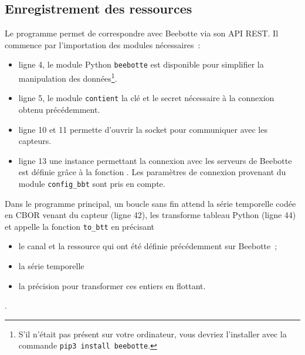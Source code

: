 \subsection{Enregistrement des ressources}

Le programme  permet de correspondre avec Beebotte via son API REST. Il commence par l'importation des modules nécessaires~:



\begin{itemize}
    \item ligne 4, le module Python \texttt{beebotte}  est disponible pour simplifier la manipulation des données\footnote{S'il n'était pas présent sur votre ordinateur, vous devriez l'installer avec la commande \texttt{pip3 install beebotte}.}.
    \item ligne 5, le module \texttt{contient} la clé et le secret nécessaire à la connexion obtenu précédemment.
    
\end{itemize}




\begin{itemize}
    \item ligne 10 et 11 permette d'ouvrir la socket pour communiquer avec les capteurs.
\end{itemize}



\begin{itemize}
    \item ligne 13 une instance permettant la connexion avec les serveurs de Beebotte est définie grâce à la fonction . Les paramètres de connexion provenant du module \texttt{config\_bbt} sont pris en compte. 
\end{itemize}



Dans le programme principal, un boucle sans fin attend la série temporelle codée en CBOR venant du capteur (ligne 42), les transforme tableau Python (ligne 44) et appelle la fonction \texttt{to\_btt} en précisant\:
\begin{itemize}
    \item le canal et la ressource qui ont été définie précédemment sur Beebotte~;
    \item la série temporelle
    \item la précision pour transformer ces entiers en flottant.
\end{itemize}
.  

